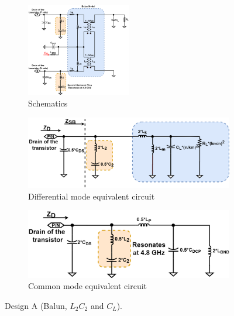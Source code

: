 \documentclass[conference]{IEEEtran}
\begin{document}
\begin{figure}[!t]
\captionsetup{font=footnotesize}
\centering
\begin{subfigure}{0.5\textwidth}
\centering
\includegraphics[width=0.5\textwidth]{Images/Design/Design_A_FC.png}
\caption{Schematics}
\label{fig:Design_A_FC}
\end{subfigure}
\begin{subfigure}[b]{0.24\textwidth}
\includegraphics[width=1\textwidth]{Images/Design/Design_A_Diff.png}
\caption{Differential mode equivalent circuit}
\label{fig:Design_A_Diff}
\end{subfigure}
\begin{subfigure}[b]{0.24\textwidth}
\includegraphics[width=1\textwidth]{Images/Design/Design_A_Com.png}
\caption{Common mode equivalent circuit}
\label{fig:Design_A_Com}
\end{subfigure}
\caption{Design A (Balun, $L_2C_2$ and $C_L$).}
\label{fig:Design_A}
\vspace{-0.3in}
\end{figure}
\end{document}

